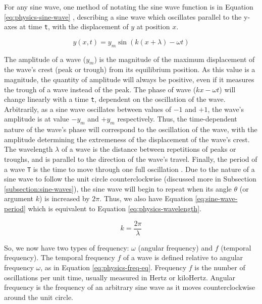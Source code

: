For any sine wave, one method of notating the sine wave function is in Equation \ref{eq:physics-sine-wave} \cite{Halliday_Resnick_Walker_2005}, describing a sine wave which oscillates parallel to the y-axes at time \texttt{t}, with the displacement of $y$ at position $x$.

\begin{equation}
	y(x,t) = y_m \sin(k(x + \lambda) - \omega t)
	\label{eq:physics-sine-wave}
\end{equation}

The amplitude of a wave ($y_m$) is the magnitude of the maximum displacement of the wave's crest (peak or trough) from its equilibrium position. As this value is a magnitude, the quantity of amplitude will always be positive, even if it measures the trough of a wave instead of the peak. The phase of wave ($kx - \omega t$) will change linearly with a time \texttt{t}, dependent on the oscillation of the wave. Arbitrarily, as a sine wave oscillates between values of $-1$ and $+1$, the wave's amplitude is at value $-y_m$ and $+y_m$ respectively. Thus, the time-dependent nature of the wave's phase will correspond to the oscillation of the wave, with the amplitude determining the extremeness of the displacement of the wave's crest. The wavelength $\lambda$ of a wave is the distance between repetitions of peaks or troughs, and is parallel to the direction of the wave's travel. Finally, the period of a wave \texttt{T} is the time to move through one full oscillation \cite{Halliday_Resnick_Walker_2005}. Due to the nature of a sine wave to follow the unit circle counterclockwise (discussed more in Subsection \ref{subsection:sine-waves}), the sine wave will begin to repeat when its angle $\theta$ (or argument $k$) is increased by $2\pi$. Thus, we also have Equation \ref{eq:sine-wave-period} which is equivalent to Equation \ref{eq:physics-wavelength}.

\begin{equation}
	k = \frac{2\pi}{\lambda}
	\label{eq:physics-wavelength}
\end{equation}

So, we now have two types of frequency: $\omega$ (angular frequency) and $f$ (temporal frequency). The temporal frequency $f$ of a wave is defined relative to angular frequency $\omega$, as in Equation \ref{eq:physics-freq-eq}. Frequency $f$ is the number of oscillations per unit time, usually measured in Hertz or kiloHertz. Angular frequency is the frequency of an arbitrary sine wave as it moves counterclockwise around the unit circle.

